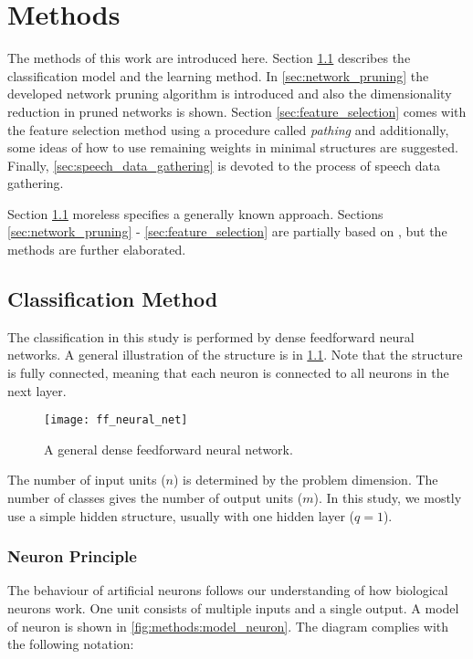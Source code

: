 \chapter{Methods} \label{chap:methods}
The methods of this work are introduced here. Section \ref{sec:classification_method} describes the classification model and the learning method. In \cref{sec:network_pruning} the developed network pruning algorithm is introduced and also the dimensionality reduction in pruned networks is shown. Section \ref{sec:feature_selection} comes with the feature selection method using a procedure called \textit{pathing} and additionally, some ideas of how to use remaining weights in minimal structures are suggested. Finally, \cref{sec:speech_data_gathering} is devoted to the process of speech data gathering.

Section \ref{sec:classification_method} moreless specifies a generally known approach. Sections \ref{sec:network_pruning} - \ref{sec:feature_selection} are partially based on \citep{bulin_2016}, but the methods are further elaborated.

\section{Classification Method} \label{sec:classification_method}
The classification in this study is performed by dense feedforward neural networks. A general illustration of the structure is in \cref{fig:methods:ff_neural_net}. Note that the structure is fully connected, meaning that each neuron is connected to all neurons in the next layer.

\begin{figure}[H]
\centering
\texttt{[image: ff\_neural\_net]}
\caption{A general dense feedforward neural network.}
\label{fig:methods:ff_neural_net}
\end{figure}

The number of input units ($ n $) is determined by the problem dimension. The number of classes gives the number of output units ($ m $). In this study, we mostly use a simple hidden structure, usually with one hidden layer ($ q = 1 $).

\subsection*{Neuron Principle}
The behaviour of artificial neurons follows our understanding of how biological neurons work. One unit consists of multiple inputs and a single output. A model of neuron is shown in \cref{fig:methods:model_neuron}. The diagram complies with the following notation:

